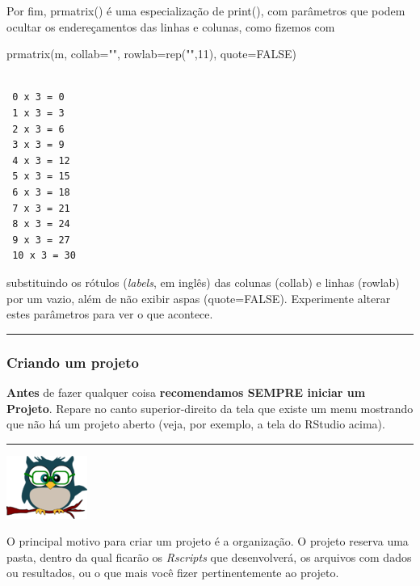 \documentclass[
]{article}
\newenvironment{Shaded}{\begin{snugshade}}{\end{snugshade}}
\newcommand{\AttributeTok}[1]{\textcolor[rgb]{0.77,0.63,0.00}{#1}}
\newcommand{\ConstantTok}[1]{\textcolor[rgb]{0.00,0.00,0.00}{#1}}
\newcommand{\DecValTok}[1]{\textcolor[rgb]{0.00,0.00,0.81}{#1}}
\newcommand{\FunctionTok}[1]{\textcolor[rgb]{0.00,0.00,0.00}{#1}}
\newcommand{\NormalTok}[1]{#1}
\newcommand{\StringTok}[1]{\textcolor[rgb]{0.31,0.60,0.02}{#1}}
\begin{document}
Por fim, prmatrix() é uma especialização de print(), com parâmetros que
podem ocultar os endereçamentos das linhas e colunas, como fizemos com

\begin{Shaded}
\begin{Highlighting}[]
\FunctionTok{prmatrix}\NormalTok{(m, }\AttributeTok{collab=}\StringTok{""}\NormalTok{, }\AttributeTok{rowlab=}\FunctionTok{rep}\NormalTok{(}\StringTok{""}\NormalTok{,}\DecValTok{11}\NormalTok{), }\AttributeTok{quote=}\ConstantTok{FALSE}\NormalTok{)}
\end{Highlighting}
\end{Shaded}

\begin{verbatim}
            
 0 x 3 = 0  
 1 x 3 = 3  
 2 x 3 = 6  
 3 x 3 = 9  
 4 x 3 = 12 
 5 x 3 = 15 
 6 x 3 = 18 
 7 x 3 = 21 
 8 x 3 = 24 
 9 x 3 = 27 
 10 x 3 = 30
\end{verbatim}

substituindo os rótulos (\emph{labels}, em inglês) das colunas (collab)
e linhas (rowlab) por um vazio, além de não exibir aspas (quote=FALSE).
Experimente alterar estes parâmetros para ver o que acontece.

\begin{center}\rule{0.5\linewidth}{0.5pt}\end{center}

\hypertarget{criando-um-projeto}{%
\subsubsection{Criando um projeto}\label{criando-um-projeto}}

\textbf{Antes} de fazer qualquer coisa \textbf{recomendamos SEMPRE
iniciar um Projeto}. Repare no canto superior-direito da tela que existe
um menu mostrando que não há um projeto aberto (veja, por exemplo, a
tela do RStudio acima).

\begin{center}\rule{0.5\linewidth}{0.5pt}\end{center}

\begin{flushleft}\includegraphics[width=0.08\linewidth]{coruja} \end{flushleft}

O principal motivo para criar um projeto é a organização. O projeto
reserva uma pasta, dentro da qual ficarão os \emph{Rscripts} que
desenvolverá, os arquivos com dados ou resultados, ou o que mais você
fizer pertinentemente ao projeto.
\end{document}

